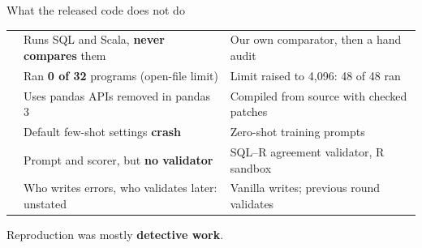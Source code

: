 \documentclass[11pt,aspectratio=169]{beamer}
\begin{document}
\begin{frame}{What the released code does not do}
\vspace{0.05cm}
{\footnotesize\setlength{\tabcolsep}{4pt}\renewcommand{\arraystretch}{1.08}
\begin{tabular}{@{}L{2.4cm}L{5.0cm}>{}L{6.0cm}@{}}
\toprule
&  & \\\midrule
{} & Runs SQL and Scala, \textbf{never compares} them & Our own comparator, then a hand audit\\
 & Ran \textbf{0 of 32} programs (open-file limit) & Limit raised to 4,096: 48 of 48 ran\\
 & Uses pandas APIs removed in pandas 3 & Compiled from source with checked patches\\
 & Default few-shot settings \textbf{crash} & Zero-shot training prompts\\
 & Prompt and scorer, but \textbf{no validator} & SQL--R agreement validator, R sandbox\\
 & Who writes errors, who validates later: unstated & Vanilla writes; previous round validates\\
\bottomrule
\end{tabular}}
\vspace{0.3cm}
\begin{center}\large Reproduction was mostly \textbf{\color{tsred}detective work}.\end{center}
\end{frame}
\end{document}
